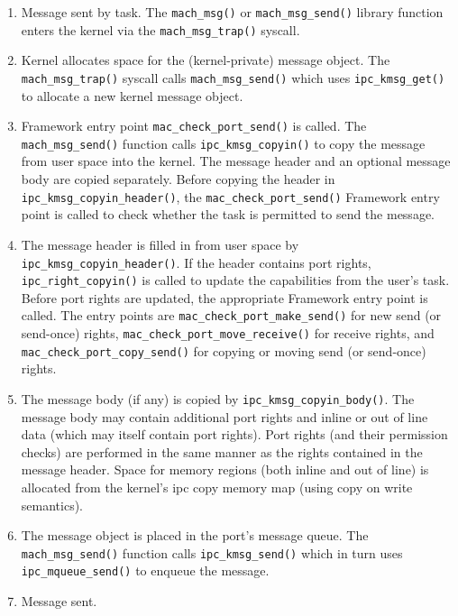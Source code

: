 \begin{enumerate}
\item {Message sent by task.}
The {\tt mach\_msg()} or {\tt mach\_msg\_send()} library function enters the
kernel via the {\tt mach\_msg\_trap()} syscall.

\item {Kernel allocates space for the (kernel-private) message object.}
The {\tt mach\_msg\_trap()} syscall calls {\tt mach\_msg\_send()} which uses
{\tt ipc\_kmsg\_get()} to allocate a new kernel message object.

\item {Framework entry point {\tt mac\_check\_port\_send()} is called.}
The {\tt mach\_msg\_send()} function calls {\tt ipc\_kmsg\_copyin()}
to copy the message from user space into the kernel.  The message header
and an optional message body are copied separately.  Before
copying the header in {\tt ipc\_kmsg\_copyin\_header()}, the
{\tt mac\_check\_port\_send()} Framework entry point is called to check
whether the task is permitted to send the message.

\item {The message header is filled in from user space by {\tt ipc\_kmsg\_copyin\_header()}.}
If the header contains port rights, {\tt ipc\_right\_copyin()} is called
to update the capabilities from the user's task.  Before port
rights are updated, the appropriate Framework entry point is
called.  The entry points are {\tt mac\_check\_port\_make\_send()} for
new send (or send-once) rights, {\tt mac\_check\_port\_move\_receive()}
for receive rights, and {\tt mac\_check\_port\_copy\_send()} for copying
or moving send (or send-once) rights.

\item {The message body (if any) is copied by {\tt ipc\_kmsg\_copyin\_body()}.}
The message body may contain additional port rights and inline
or out of line data (which may itself contain port rights).
Port rights (and their permission checks) are performed in the
same manner as the rights contained in the message header.
Space for memory regions (both inline and out of line) is
allocated from the kernel's ipc copy memory map (using copy on
write semantics).

\item {The message object is placed in the port's message queue.}
The {\tt mach\_msg\_send()} function calls {\tt ipc\_kmsg\_send()} which in
turn uses {\tt ipc\_mqueue\_send()} to enqueue the message.

\item {Message sent.}


\end{enumerate}
